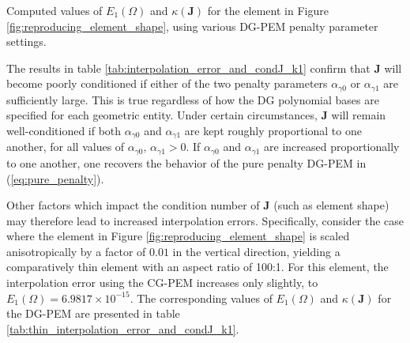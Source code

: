 \begin{table}
\caption{Computed values of $E_1 (\Omega)$ and $\kappa(\mathbf{J})$ for the element in Figure \ref{fig:reproducing_element_shape}, using various DG-PEM penalty parameter settings.}
\label{tab:interpolation_error_and_condJ_k1}
\end{table}

The results in table \ref{tab:interpolation_error_and_condJ_k1} confirm that $\mathbf{J}$ will become poorly conditioned if either of the two penalty parameters $\alpha_{\gamma0}$ or $\alpha_{\gamma1}$ are sufficiently large. This is true regardless of how the DG polynomial bases are specified for each geometric entity. Under certain circumstances, $\mathbf{J}$ will remain well-conditioned if both $\alpha_{\gamma0}$ and $\alpha_{\gamma1}$ are kept roughly proportional to one another, for all values of $\alpha_{\gamma0}, \, \alpha_{\gamma1} > 0$. If $\alpha_{\gamma0}$ and $\alpha_{\gamma1}$ are increased proportionally to one another, one recovers the behavior of the pure penalty DG-PEM in (\ref{eq:pure_penalty}).

Other factors which impact the condition number of $\mathbf{J}$ (such as element shape) may therefore lead to increased interpolation errors. Specifically, consider the case where the element in Figure \ref{fig:reproducing_element_shape} is scaled anisotropically by a factor of $0.01$ in the vertical direction, yielding a comparatively thin element with an aspect ratio of 100:1. For this element, the interpolation error using the CG-PEM increases only slightly, to $E_1 (\Omega) = 6.9817 \times 10^{-15}$. The corresponding values of $E_1 (\Omega)$ and $\kappa(\mathbf{J})$ for the DG-PEM are presented in table \ref{tab:thin_interpolation_error_and_condJ_k1}.


